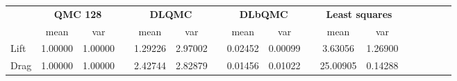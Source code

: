 \begin{tabular}{lcccccccccccccccc}
\toprule
 &\multicolumn{2}{c}{\textbf{QMC 128}}&&\multicolumn{2}{c}{\textbf{DLQMC}}&&\multicolumn{2}{c}{\textbf{DLbQMC}}&&\multicolumn{2}{c}{\textbf{Least squares}}\\ 
\cmidrule(r){2-3} \cmidrule(r){5-6} \cmidrule(r){8-9}
 &mean&var&&mean&var&&mean&var&&mean&var\\ 
\midrule
Lift &1.00000&1.00000&&1.29226&2.97002&&0.02452&0.00099&&3.63056&1.26900\\ 
Drag &1.00000&1.00000&&2.42744&2.82879&&0.01456&0.01022&&25.00905&0.14288\\ 
\bottomrule
\end{tabular}

